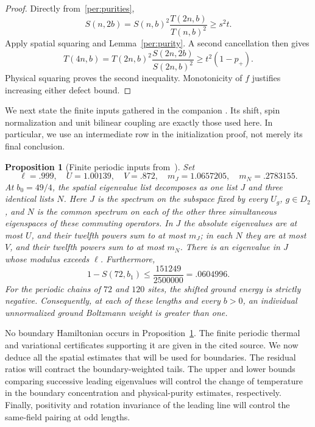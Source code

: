 \documentclass[11pt]{article}
\newtheorem{proposition}[theorem]{Proposition}
\theoremstyle{remark}
\numberwithin{equation}{section}
\begin{document}
\begin{proof}
Directly from~\eqref{per:purities},
\[
 S(n,2b)=S(n,b)^2\frac{T(2n,b)}{T(n,b)^2}
 \ge s^2t.
\]
Apply spatial squaring and Lemma~\ref{per:purity}.  A second cancellation
then gives
\[
 T(4n,b)=T(2n,b)^2\frac{S(2n,2b)}{S(2n,b)^2}
 \ge t^2(1-p_+).
\]
Physical squaring proves the second inequality.  Monotonicity of $f$
justifies increasing either defect bound.
\end{proof}

We next state the finite inputs gathered in the companion
\cite[Corollary 5.6]{periodic}. Its shift, spin normalization and unit
bilinear coupling are exactly those used here.
In particular, we use an intermediate row in the initialization proof,
not merely its final conclusion.

\begin{proposition}[Finite periodic inputs from~\cite{periodic}]
\label{per:native}
Set
\begin{equation}\label{per:constants}
 \ell=.999,\quad U=1.00139,\quad V=.872,\quad
 m_J=1.0657205,\quad m_N=.2783155.
\end{equation}
At $b_0=49/4$, the spatial eigenvalue list decomposes as one list $J$
and three identical lists $N$. Here $J$ is the spectrum on the subspace
fixed by every $U_g$, $g\in D_2$, and $N$ is the common spectrum on
each of the other three simultaneous eigenspaces of these commuting
operators.
In $J$ the absolute eigenvalues are at
most $U$, and their twelfth powers sum to at most $m_J$; in each $N$
they are at most $V$, and their twelfth powers sum to at most $m_N$.
There is an eigenvalue in $J$ whose modulus exceeds $\ell$.
Furthermore,
\begin{equation}\label{per:native-first-row}
 1-S(72,b_1)\le\frac{151249}{2500000}=.0604996.
\end{equation}
For the periodic chains of $72$ and $120$ sites, the shifted ground
energy is strictly negative.  Consequently, at each of these lengths
and every $b>0$, an individual unnormalized ground Boltzmann weight is
greater than one.
\end{proposition}

No boundary Hamiltonian occurs in Proposition~\ref{per:native}.
The finite periodic thermal and variational certificates supporting it
are given in the cited source.  We now deduce all the spatial estimates
that will be used for boundaries. The residual ratios will contract
the boundary-weighted tails. The upper and lower bounds comparing
successive leading eigenvalues will control the change of temperature
in the boundary concentration and physical-purity estimates,
respectively. Finally, positivity and rotation invariance of the
leading line will control the same-field pairing at odd lengths.
\end{document}
